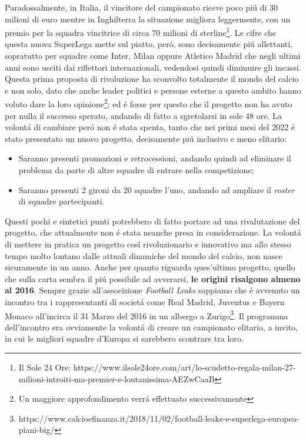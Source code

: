 \documentclass[
    corpo=12pt,
    oneside,
    evenboxes,
    tipotesi=triennale,
    stile=classica,
    oldstyle,
    autoretitolo,
    greek,
]{toptesi}
\begin{document}
\begin{interlinea}{1.5}
Paradossalmente, in Italia, il vincitore del campionato riceve poco pi\'u di 30 milioni di euro mentre in Inghilterra la situazione migliora 
leggermente, con un premio per la squadra vincitrice di circa 70 milioni di sterline\footnote{Il Sole 24 Ore: https://www.ilsole24ore.com/art/lo-scudetto-regala-milan-27-milioni-introiti-ma-premier-e-lontanissima-AEZwCaaB}. 
Le cifre che questa nuova SuperLega mette sul piatto, per\'o, sono decisamente pi\'u allettanti, sopratutto per squadre come Inter, 
Milan oppure Atletico Madrid che negli ultimi anni sono usciti dai riflettori internazionali, vedendosi quindi diminuire gli incassi.\newline
Questa prima proposta di rivoluzione ha sconvolto totalmente il mondo del calcio e non solo, dato che anche leader politici e persone esterne
a questo ambito hanno voluto dare la loro opinione\footnote{Un maggiore approfondimento verr\'a effettuato successivamente}; ed \'e forse per 
questo che il progetto non ha avuto per nulla il successo sperato, andando di fatto a sgretolarsi in sole 48 ore. La volont\'a di 
cambiare per\'o non \'e stata spenta, tanto che nei primi mesi del 2022 \'e stato presentato un nuovo progetto, decisamente pi\'u inclusivo e 
meno elitario:
\begin{itemize}
    \item Saranno presenti promozioni e retrocessioni, andando quindi ad eliminare il problema da parte di altre squadre di entrare nella competizione;
    \item Saranno presenti 2 gironi da 20 squadre l'uno, andando ad ampliare il \emph{roster} di squadre partecipanti.
\end{itemize} 
Questi pochi e sintetici punti potrebbero di fatto portare ad una rivalutazione del progetto, che attualmente non \'e stata neanche presa in
considerazione. 
La volont\'a di mettere in pratica un progetto cos\'i rivoluzionario e innovativo ma allo stesso tempo molto lontano dalle attuali dinamiche del
mondo del calcio, non nasce sicuramente in un anno. Anche per quanto riguarda ques'ultimo progetto, quello che sulla carta sembra il pi\'u
possibile ad avverarsi, \textbf{le origini risalgono almeno al 2016}. Sempre grazie all'associzione \emph{Football Leaks} sappiamo che \'e avvenuto un incontro tra i 
rappresentanti di societ\'a come Real Madrid, Juventus e Bayern Monaco all'incirca il 31 Marzo del 2016 in un albergo a Zurigo\footnote{https://www.calcioefinanza.it/2018/11/02/football-leaks-e-superlega-europea-piani-big/}. Il programma
dell'incontro era ovviamente la volont\'a di creare un campionato elitario, a invito, in cui le migliori squadre d'Europa si sarebbero scontrare tra loro. 

\end{interlinea}
\end{document}
